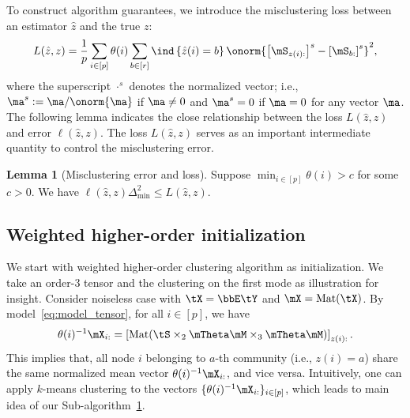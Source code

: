 \documentclass[lettersize,onecolumn,journal]{IEEEtran}
\theoremstyle{definition}
\newtheorem{lem}{Lemma}
\theoremstyle{definition}
\newcommand{\off}[1]{\left[#1\right]}
\newcommand{\offf}[1]{\left\{#1\right\}}
\def\fixme#1#2{\textbf{\color{red}[FIXME (#1): #2]}}
\begin{document}
{
  

To construct algorithm guarantees,  we introduce the misclustering loss between an estimator $\hat z$ and the true $z$:
\begin{equation}\label{eq:defnofL}
    L(\hat z, z) = \frac{1}{p}  \sum_{i \in [p]} \theta(i) \sum_{b \in [r]}  \ind \offf{ \hat z(i) = b } \onorm{ \off{ \mS_{ z(i):}  }^s - \off{ \mS_{b:}  }^s  }^2,
\end{equation}
where the superscript $\cdot^{s}$ denotes the normalized vector; i.e., $\ma^s:=\ma/\onorm{\ma}$ if $\ma\neq 0$ and $\ma^{s}=0$ if $\ma=0$ for any vector $\ma$. The following lemma indicates the close relationship between the loss $L(\hat z, z)$ and error $\ell(\hat z, z)$. The loss $L(\hat z, z)$ serves as an important intermediate quantity to control the misclustering error.

\begin{lem}[Misclustering error and loss]\label{lem:mis}Suppose $\min_{i \in [p]}\theta(i) > c$ for some $c > 0$. We have $\ell(\hat z, z) \Delta_{\min}^2 \leq L(\hat z, z)$.
\end{lem}

}

\subsection{Weighted higher-order initialization}

We start with weighted higher-order clustering algorithm as initialization.   {We take an order-3 tensor and the clustering on the first mode as illustration for insight.} Consider noiseless case with $\tX = \bbE\tY$ and $\mX = \text{Mat}(\tX)$. 
By model~\eqref{eq:model_tensor}, for all $i \in [p]$, we have
\begin{equation}\label{eq:kmeans}
    \theta(i)^{-1} \mX_{i:} = \off{\text{Mat}( \tS \times_2 \mTheta \mM \times_3  \mTheta \mM )}_{z(i):}. 
\end{equation}
This implies that, all node $i$ belonging to $a$-th community (i.e., $z(i)=a$) share the same normalized mean vector $\theta(i)^{-1} \mX_{i:}$, and vice versa. Intuitively, one can apply $k$-means clustering to the vectors $\{ \theta(i)^{-1} \mX_{i:} \}_{i\in[p]}$, which leads to main idea of our Sub-algorithm~\hyperref[alg:main]{1}.  
\end{document}
